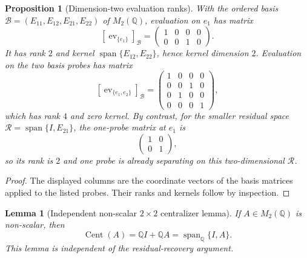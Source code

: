 \documentclass[11pt]{article}
\newtheorem{proposition}{Proposition}
\newtheorem{lemma}{Lemma}
\theoremstyle{definition}
\theoremstyle{remark}
\newcommand{\QQ}{\mathbb{Q}}
\begin{document}
\begin{proposition}[Dimension-two evaluation ranks]
\label{prop:c5-ranks}
With the ordered basis
\(\mathcal B=(E_{11},E_{12},E_{21},E_{22})\) of \(M_2(\QQ)\), evaluation on
\(e_1\) has matrix
\[
  [\operatorname{ev}_{\{e_1\}}]_{\mathcal B}
  =\begin{pmatrix}1&0&0&0\\0&0&1&0\end{pmatrix}.
\]
It has rank \(2\) and kernel
\(\operatorname{span}\{E_{12},E_{22}\}\), hence kernel dimension \(2\).
Evaluation on the two basis probes has matrix
\[
  [\operatorname{ev}_{\{e_1,e_2\}}]_{\mathcal B}
  =\begin{pmatrix}
      1&0&0&0\\0&0&1&0\\0&1&0&0\\0&0&0&1
    \end{pmatrix},
\]
which has rank \(4\) and zero kernel.  By contrast, for the smaller residual
space \(\mathcal R=\operatorname{span}\{I,E_{21}\}\), the one-probe matrix
at \(e_1\) is
\[
  \begin{pmatrix}1&0\\0&1\end{pmatrix},
\]
so its rank is \(2\) and one probe is already separating on this
two-dimensional \(\mathcal R\).
\end{proposition}

\begin{proof}
The displayed columns are the coordinate vectors of the basis matrices
applied to the listed probes.  Their ranks and kernels follow by inspection.
\end{proof}

\begin{lemma}[Independent non-scalar \(2\times2\) centralizer lemma]
\label{lem:c5-centralizer}
If \(A\in M_2(\QQ)\) is non-scalar, then
\[
  \operatorname{Cent}(A)=\QQ I+\QQ A=\operatorname{span}_{\QQ}\{I,A\}.
\]
This lemma is independent of the residual-recovery argument.
\end{lemma}
\end{document}
